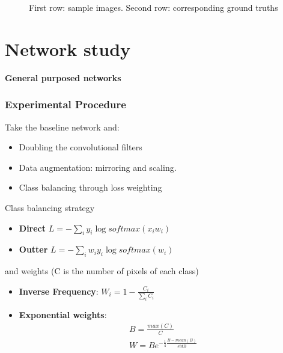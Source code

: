 \documentclass{beamer}
\begin{document}
\begin{frame}
\begin{figure}
\caption{First row: sample images. Second row: corresponding ground truths}
\label{dataset:samples}
\end{figure}

\end{frame}

\section{Network study}
\begin{frame}
\huge{\centerline{\textbf{General purposed networks}}}
\end{frame}


\begin{frame}
\frametitle{Experimental Procedure}

Take the baseline network and:

\begin{itemize}
\item Doubling the convolutional filters
\item Data augmentation: mirroring and scaling.
\item Class balancing through loss weighting
\end{itemize}

Class balancing strategy 

\begin{itemize}
\item \textbf{Direct} $L = -\sum_{i}y_{i}\log{softmax(x_{i}w_{i})}$
\item \textbf{Outter} $L = -\sum_{i}w_{i}y_{i}\log{softmax(w_{i})}$
\end{itemize}

 
and weights (C is the number of pixels of each class)

\begin{itemize}
\item \textbf{Inverse Frequency}: $W_{i} = 1 -\frac{C_{i}}{\sum_{i}C_{i}}$
\item \textbf{Exponential weights}: \begin{eqnarray*}
B = \frac{max(C)}{C}\\
W = B e^{-\frac{1}{4}\frac{B-mean(B)}{std{B}}} 
\end{eqnarray*}
\end{itemize}

\end{frame}
\end{document}
